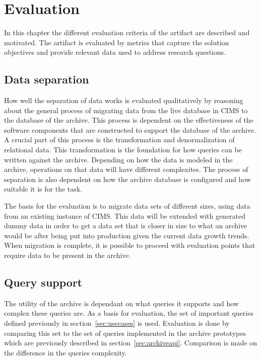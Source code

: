 \chapter{Evaluation}
\label{chap:eval}

In this chapter the different evaluation criteria of the artifact are described and motivated. The artifact is evaluated by metrics that capture the solution objectives and provide relevant data used to address research questions.

\section{Data separation}
How well the separation of data works is evaluated qualitatively by reasoning about the general process of migrating data from the live database in CIMS to the database of the archive. This process is dependent on the effectiveness of the software components that are constructed to support the database of the archive.
A crucial part of this process is the transformation and denormalization of relational data. This transformation is the foundation for how queries can be written against the archive. Depending on how the data is modeled in the archive, operations on that data will have different complexites. The process of separation is also dependent on how the archive database is configured and how suitable it is for the task. 

The basis for the evaluation is to migrate data sets of different sizes, using data from an existing instance of CIMS. This data will be extended with generated dummy data in order to get a data set that is closer in size to what an archive would be after being put into production given the current data growth trends. When migration is complete, it is possible to proceed with evaluation points that require data to be present in the archive.  

\section{Query support}
The utility of the archive is dependant on what queries it supports and how complex these queries are. As a basis for evaluation, the set of important queries defined previously in section~\ref{sec:usecases} is used. Evaluation is done by comparing this set to the set of queries implemented in the archive prototypes which are previously described in section~\ref{sec:archiveapi}. Comparison is made on the difference in the queries complexity. 

